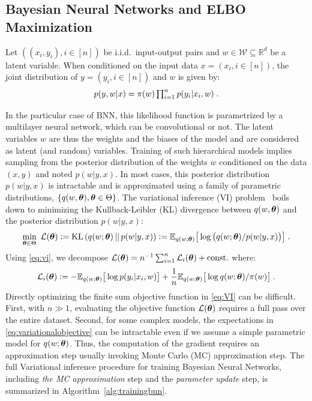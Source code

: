 \documentclass{article} %
\begin{document}
\subsection{Bayesian Neural Networks and ELBO Maximization}
Let $((x_i,y_i),  i \in [n])$ be i.i.d.~input-output pairs and $w \in \mathcal{W} \subseteq \mathbb{R}^{d}$ be a latent variable. When conditioned on the input data $x = (x_i, i \in [n])$, the joint distribution of $y = (y_i, i \in [n])$ and $w$ is given by:
\begin{equation}\label{eq:vi} \textstyle
    p(y,w | x) = \prior(w)\prod_{i=1}^{n}{p(y_i | x_i, w)} \eqsp.
\end{equation}

In the particular case of BNN, this likelihood function is parametrized by a multilayer neural network, which can be convolutional or not.
The latent variables $w$ are thus the weights and the biases of the model and are considered as latent (and random) variables.
Training of such hierarchical models implies sampling from the posterior distribution of the weights $w$ conditioned on the data $(x,y)$ and noted $p(w|y,x)$.
In most cases, this posterior distribution $p(w|y,x)$ is intractable and is approximated using a family of parametric distributions, $\{q(w, \param ), \param \in \Param \}$. 
The variational inference (VI) problem~\citep{blei2017variational} boils down to minimizing the Kullback-Leibler (KL) divergence between $q(w, \param )$ and the posterior distribution $p(w|y,x)$:
\begin{equation} \label{eq:VI}  
\min_{ \param \in \Param }~{\cal L}(\param ) \eqdef \infdiv{q(w; \param )}{p(w|y,x)} \eqdef \EE_{ q( w; \param )} \big[ \log \big( q(w; \param ) / p(w|y,x) \big) \big] \eqsp.
\end{equation}
Using \eqref{eq:vi}, we decompose ${\cal L}(\param) = n^{-1} \sum_{i=1}^{n}{{\cal L}_i(\param)} + {\rm const}.$ where:
\begin{equation}\label{eq:variationalobjective}
{\cal L}_i(\param) \eqdef -\EE_{ q( w; \param )} \big[\log p(y_i | x_i, w) \big]+  \frac{1}{n} \EE_{ q( w; \param )} \big[ \log q(w; \param )/\prior(w) \big]  \eqsp.
\end{equation}
Directly optimizing the finite sum objective function in \eqref{eq:VI} can be difficult.
First, with $n \gg 1$, evaluating the objective function ${\cal L}( \param )$ requires a full pass over the entire dataset.
Second, for some complex models, the expectations in \eqref{eq:variationalobjective} can be intractable even if we assume a simple parametric model for $q(w; \param)$.
Thus, the computation of the gradient requires an approximation step usually invoking Monte Carlo (MC) approximation step. 
The full Variational inference procedure for training Bayesian Neural Networks, including \textit{the MC approximation} step and the \textit{parameter update} step, is summarized in Algorithm~\ref{alg:trainingbnn}.
\end{document}
